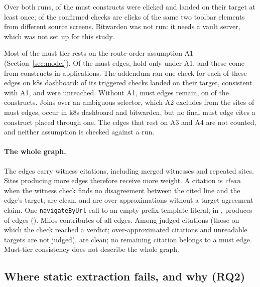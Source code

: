 Over both runs, \MustRunConfirmedConstructs{} of the \CensusMustSites{} must constructs were
clicked and landed on their target at least once; \MustRunAddKdashConfirmed{} of the confirmed
checks are clicks of the same two toolbar elements from different source screens. Bitwarden was not run: it
needs a vault server, which was not set up for this study.

Most of the must tier rests on the route-order assumption A1 (Section~\ref{sec:model}). Of the
\RouteOrderMust{} must edges, \RouteOrderResting{} hold only under A1, and these come from
\RouteOrderRestingSites{} constructs in \RouteOrderRestingApps{} applications. The addendum ran one check for each of these edges on k8s dashboard:
\MustRunAddKdashConfirmed{} of its \MustRunAddKdashTriggered{} triggered checks landed on their
target, consistent with A1, and \MustRunAddKdashUnreached{} were unreached. Without A1,
\RouteOrderMustWithout{} must edges remain, on \RouteOrderSitesWithout{} of the \RouteOrderSites{}
constructs. Joins over an ambiguous selector, which A2 excludes from the sites of must edges, occur
in k8s dashboard and bitwarden, but no final must edge cites a construct placed through one. The
edges that rest on A3 and A4 are not counted, and neither assumption is checked against a run.

\paragraph{The whole graph.} The \RoundTwoEdges{} edges carry \RoundTwoSites{} witness citations,
including merged witnesses and repeated sites. Sites producing more edges therefore receive
more weight. A citation is \emph{clean} when the witness check finds no disagreement between the cited line and the edge's target; \RoundTwoGraphClean{} are clean, and \RoundTwoOverApprox{} are over-approximations
without a target-agreement claim. One \texttt{navigateByUrl} call to an empty-prefix template
literal, \RoundTwoTopFanoutSite{} in \RoundTwoTopFanoutApp{}, produces \RoundTwoTopFanoutShare{}
of edges (\RoundTwoTopFanoutEdges{}). Mifos contributes \RoundTwoMifosEdgeShare{} of all edges.
Among \RoundTwoJudged{} judged citations (those on which the check reached a verdict; over-approximated citations and unreadable targets are not judged), \RoundTwoJudgedClean{}
are clean; no remaining citation belongs to a must edge. Must-tier consistency does not describe
the whole graph.

\subsection{Where static extraction fails, and why (RQ2)}
\label{sec:res-defects}

